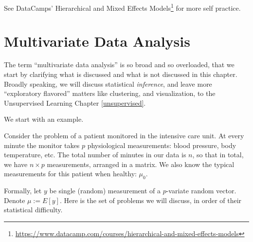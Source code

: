 \documentclass[]{book}
\renewcommand{\href}[2]{#2\footnote{\url{#1}}}
\theoremstyle{definition}
\theoremstyle{definition}
\theoremstyle{definition}
\theoremstyle{remark}
\let\BeginKnitrBlock\begin \let\EndKnitrBlock\end
\begin{document}
See DataCamps' \href{https://www.datacamp.com/courses/hierarchical-and-mixed-effects-models}{Hierarchical and Mixed Effects Models} for more self practice.

\hypertarget{multivariate}{%
\chapter{Multivariate Data Analysis}\label{multivariate}}

The term ``multivariate data analysis'' is so broad and so overloaded, that we start by clarifying what is discussed and what is not discussed in this chapter.
Broadly speaking, we will discuss statistical \emph{inference}, and leave more ``exploratory flavored'' matters like clustering, and visualization, to the Unsupervised Learning Chapter \ref{unsupervised}.

We start with an example.

\BeginKnitrBlock{example}
\protect\hypertarget{exm:icu}{}{\label{exm:icu} }Consider the problem of a patient monitored in the intensive care unit.
At every minute the monitor takes \(p\) physiological measurements: blood pressure, body temperature, etc.
The total number of minutes in our data is \(n\), so that in total, we have \(n \times p\) measurements, arranged in a matrix.
We also know the typical measurements for this patient when healthy: \(\mu_0\).
\EndKnitrBlock{example}

Formally, let \(y\) be single (random) measurement of a \(p\)-variate random vector.
Denote \(\mu:=E[y]\).
Here is the set of problems we will discuss, in order of their statistical difficulty.
\end{document}
